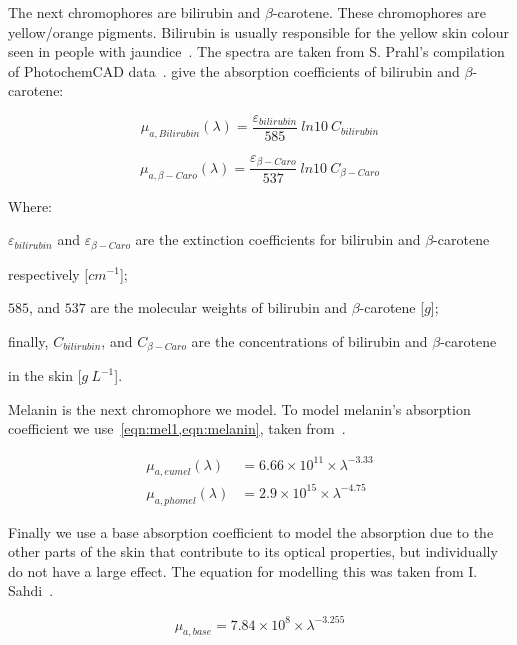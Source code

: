 The next chromophores are bilirubin and $\beta$-carotene.
These chromophores are yellow/orange pigments. 
Bilirubin is usually responsible for the yellow skin colour seen in people with jaundice~\cite{jacques1997developing}.
The spectra are taken from S. Prahl's compilation of PhotochemCAD data~\cite{prahlcaro,prahlbili}.
 give the absorption coefficients of bilirubin and $\beta$-carotene:

\begin{equation}
\mu_{a,Bilirubin}(\lambda)=\frac{\varepsilon_{bilirubin}}{585}\ ln10\ C_{bilirubin}
\label{eqn:bili}
\end{equation}

\begin{equation}
\mu_{a,\beta-Caro}(\lambda)=\frac{\varepsilon_{\beta-Caro}}{537}\ ln10\ C_{\beta-Caro}
\label{eqn:caro}
\end{equation}

\noindent Where:

\indent $\varepsilon_{bilirubin}$ and $\varepsilon_{\beta-Caro}$ are the extinction coefficients for bilirubin and $\beta$-carotene 

\indent respectively [$cm^{-1}$];

\indent $585$, and $537$ are the molecular weights of bilirubin and $\beta$-carotene [$g$];

\indent finally, $C_{bilirubin}$, and $C_{\beta-Caro}$ are the concentrations of bilirubin and $\beta$-carotene 

\indent in the skin [$g\ L^{-1}$].

\medskip

Melanin is the next chromophore we model.
To model melanin's absorption coefficient we use~\cref{eqn:mel1,eqn:melanin}, taken from~\cite{iglesias2015biophysically}.

\begin{align}
\mu_{a,eumel}(\lambda)&=6.66\times10^{11} \times \lambda^{-3.33}\label{eqn:mel1}\\
\mu_{a,phomel}(\lambda)&=2.9\times10^{15} \times \lambda^{-4.75}
\label{eqn:melanin}
\end{align}

Finally we use a base absorption coefficient to model the absorption due to the other parts of the skin that contribute to its optical properties, but individually do not have a large effect.
The equation for modelling this was taken from I. Sahdi~\cite{saidi1992transcutaneous}.

\begin{equation}
\mu_{a,base}=7.84\times10^{8}\times\lambda^{-3.255}
\label{eqn:base}
\end{equation}


